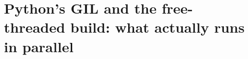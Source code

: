 \chapter{Python's GIL and the free-threaded build: what actually runs in parallel}
\label{ch:python-s-gil-and-the-free-threaded}

